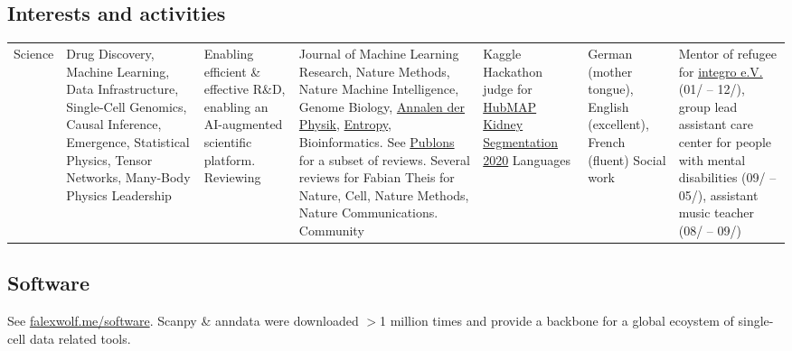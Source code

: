 \subsection*{Interests and activities}\vspace{-1em}
\begin{longtable}[t]{R{\widthC} p{\widthB}}
Science
& Drug Discovery, Machine Learning, Data Infrastructure, Single-Cell Genomics, Causal Inference, Emergence,  Statistical Physics, Tensor Networks, Many-Body Physics
\newline
Leadership 
& Enabling efficient \& effective R\&D, enabling an AI-augmented scientific platform.
\newline
Reviewing
& Journal of Machine Learning Research, Nature Methods, Nature Machine Intelligence, Genome Biology,  \href{https://en.wikipedia.org/wiki/Annalen_der_Physik}{Annalen der  Physik}, \href{https://en.wikipedia.org/wiki/Entropy_(journal)}{Entropy}, Bioinformatics. See \href{https://publons.com/author/1299815/f-alexander-wolf}{Publons} for a subset of reviews. Several reviews for Fabian Theis for Nature, Cell, Nature Methods, Nature Communications.
\newline
Community
& Kaggle Hackathon judge for \href{https://www.kaggle.com/c/hubmap-kidney-segmentation}{HubMAP Kidney Segmentation 2020}
\newline
Languages
& German (mother tongue), English (excellent), French (fluent)
\newline
Social work
& Mentor of refugee for \href{http://integro-ev.de/}{integro e.V.} (01/ -- 12/), group lead assistant care center for people with mental disabilities (09/ -- 05/), assistant music teacher (08/ -- 09/)
\end{longtable}

\subsection*{Software}
See \href{http://falexwolf.me/software/}{falexwolf.me/software}. Scanpy \& anndata were downloaded $>$1 million times and provide a backbone for a global ecoystem of single-cell data related tools.

